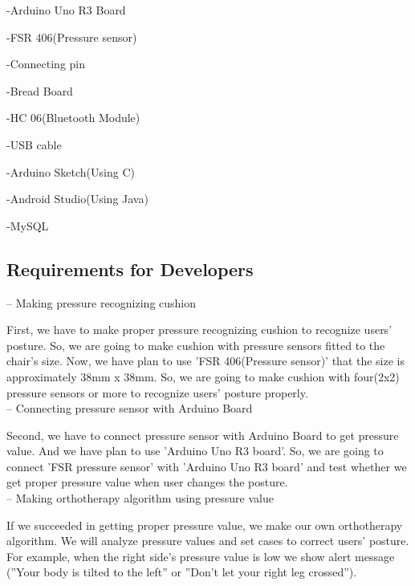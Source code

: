 \documentclass[conference]{IEEEtran}
\begin{document}

-Arduino Uno R3 Board

-FSR 406(Pressure sensor)

-Connecting pin

-Bread Board

-HC 06(Bluetooth Module)

-USB cable

-Arduino Sketch(Using C)

-Android Studio(Using Java)

-MySQL\\


\subsection{Requirements for Developers}

-- Making pressure recognizing cushion

First, we have to make proper pressure recognizing cushion to recognize users' posture. So, we are going to make cushion with pressure sensors fitted to the chair's size. Now, we have plan to use 'FSR 406(Pressure sensor)' that the size is approximately 38mm x 38mm. So, we are going to make cushion with four(2x2) pressure sensors or more to recognize users' posture properly.   \\

-- Connecting  pressure sensor with Arduino Board

Second, we have to connect pressure sensor with Arduino Board to get pressure value. And we have plan to use 'Arduino Uno R3 board'. So, we are going to connect 'FSR pressure sensor' with 'Arduino Uno R3 board' and test whether we get proper pressure value when user changes the posture. \\

-- Making orthotherapy algorithm using pressure value

If we succeeded in getting proper pressure value, we make our own orthotherapy algorithm. We will analyze pressure values and set cases to correct users' posture. For example, when the right side's pressure value is low we show alert message (''Your body is tilted to the left'' or ''Don't let your right leg crossed''). \\
\end{document}
